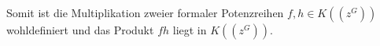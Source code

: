 {Somit ist die Multiplikation zweier formaler Potenzreihen $f,h \in K\left(\left(z^G\right)\right)$ wohldefiniert und das Produkt $fh$ liegt in $K\left(\left(z^G\right)\right)$.



%
%
%
%
%                        
%
%
%
%
%
%
%
%
%
%
}
